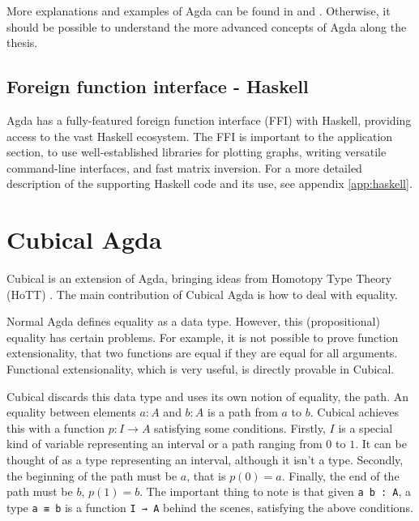 More explanations and examples of Agda can be found in \cite{agdaWebsite} and \cite{DependentTypesAtWork}. Otherwise, it should be possible to understand the more advanced concepts of Agda along the thesis.

\subsection{Foreign function interface - Haskell}
Agda has a fully-featured foreign function interface (FFI) with Haskell, providing access to the vast Haskell ecosystem. The FFI is important to the application section, to use well-established libraries for plotting graphs, writing versatile command-line interfaces, and fast matrix inversion. For a more detailed description of the supporting Haskell code and its use, see appendix \ref{app:haskell}.





\section{Cubical Agda}
Cubical \cite{cubicalAgdaDocs} is an extension of Agda, bringing ideas from Homotopy Type Theory (HoTT) \cite{hottBook}. The main contribution of Cubical Agda is how to deal with equality.

Normal Agda defines equality as a data type. However, this (propositional) equality has certain problems. For example, it is not possible to prove function extensionality, that two functions are equal if they are equal for all arguments. Functional extensionality, which is very useful, is directly provable in Cubical.

Cubical discards this data type and uses its own notion of equality, the path. An equality between elements $a : A$ and $b : A$ is a path from $a$ to $b$.
Cubical achieves this with a function $p : I \rightarrow A$ satisfying some conditions. Firstly, $I$ is a special kind of variable representing an interval or a path ranging from $0$ to $1$. It can be thought of as a type representing an interval, although it isn't a type. Secondly, the beginning of the path must be $a$, that is $p(0)=a$. Finally, the end of the path must be $b$, $p(1)=b$. The important thing to note is that given \texttt{a b : A}, a type \texttt{a ≡ b} is a function \texttt{I → A} behind the scenes, satisfying the above conditions. 

